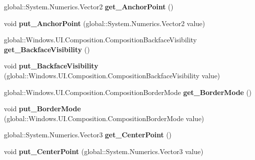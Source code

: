 \begin{DoxyCompactItemize}
global\+::\+System.\+Numerics.\+Vector2 {\bfseries get\+\_\+\+Anchor\+Point} ()
\item 
\mbox{\label{interface_windows_1_1_u_i_1_1_composition_1_1_i_visual_a2a44f2ada8b97071f0b6b3139bf1aaae}} 
void {\bfseries put\+\_\+\+Anchor\+Point} (global\+::\+System.\+Numerics.\+Vector2 value)
\item 
\mbox{\label{interface_windows_1_1_u_i_1_1_composition_1_1_i_visual_a83e38e1d6e7fc6654c6e612d6e9314dd}} 
global\+::\+Windows.\+U\+I.\+Composition.\+Composition\+Backface\+Visibility {\bfseries get\+\_\+\+Backface\+Visibility} ()
\item 
\mbox{\label{interface_windows_1_1_u_i_1_1_composition_1_1_i_visual_a22c2fbf95af53308d61ed61707e52a15}} 
void {\bfseries put\+\_\+\+Backface\+Visibility} (global\+::\+Windows.\+U\+I.\+Composition.\+Composition\+Backface\+Visibility value)
\item 
\mbox{\label{interface_windows_1_1_u_i_1_1_composition_1_1_i_visual_ad857db42be0a85e8710144f9a8a0b412}} 
global\+::\+Windows.\+U\+I.\+Composition.\+Composition\+Border\+Mode {\bfseries get\+\_\+\+Border\+Mode} ()
\item 
\mbox{\label{interface_windows_1_1_u_i_1_1_composition_1_1_i_visual_a81dd6285766651fb4d55a78808dbfbdf}} 
void {\bfseries put\+\_\+\+Border\+Mode} (global\+::\+Windows.\+U\+I.\+Composition.\+Composition\+Border\+Mode value)
\item 
\mbox{\label{interface_windows_1_1_u_i_1_1_composition_1_1_i_visual_a155a09b37b8789970281666bc3111f3d}} 
global\+::\+System.\+Numerics.\+Vector3 {\bfseries get\+\_\+\+Center\+Point} ()
\item 
\mbox{\label{interface_windows_1_1_u_i_1_1_composition_1_1_i_visual_ac736f9c5171d694ea168970125dee881}} 
void {\bfseries put\+\_\+\+Center\+Point} (global\+::\+System.\+Numerics.\+Vector3 value)

\end{DoxyCompactItemize}
